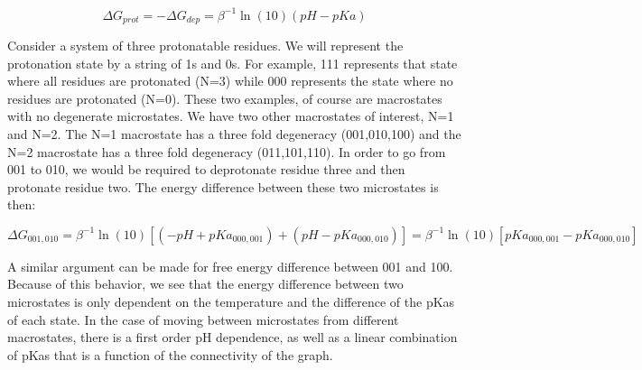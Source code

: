 \begin{equation}
  \Delta G_{prot} = -\Delta G_{dep} = \beta^{-1} \ln(10)(pH-pKa)
\end{equation}

Consider a system of three protonatable residues. We will represent
the protonation state by a string of 1s and 0s. For example, 111
represents that state where all residues are protonated (N=3) while
000 represents the state where no residues are protonated (N=0). These
two examples, of course are macrostates with no degenerate
microstates. We have two other macrostates of interest, N=1 and
N=2. The N=1 macrostate has a three fold degeneracy (001,010,100) and
the N=2 macrostate has a three fold degeneracy (011,101,110). In order
to go from 001 to 010, we would be required to deprotonate residue
three and then protonate residue two. The energy difference between
these two microstates is then:

\begin{equation}
  \Delta G_{001,010} = \beta^{-1} \ln(10)\left[ (-pH + pKa_{000,001}) + (pH - pKa_{000,010}) \right] = \beta^{-1} \ln(10) \left[ pKa_{000,001} - pKa_{000,010}\right]
\end{equation}

A similar argument can be made for free energy difference between 001
and 100. Because of this behavior, we see that the energy difference
between two microstates is only dependent on the temperature and the
difference of the pKas of each state. In the case of moving between
microstates from different macrostates, there is a first order pH
dependence, as well as a linear combination of pKas that is a function
of the connectivity of the graph.
